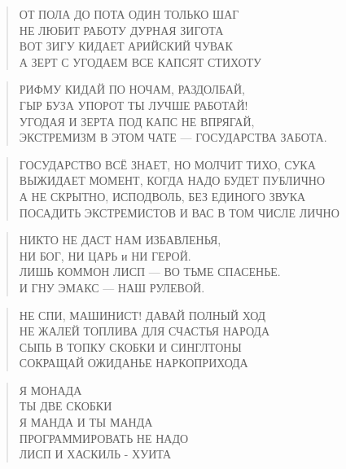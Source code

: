 \poemtitle{***}
\begin{verse}
ОТ ПОЛА ДО ПОТА ОДИН ТОЛЬКО ШАГ\\
НЕ ЛЮБИТ РАБОТУ ДУРНАЯ ЗИГОТА\\
ВОТ ЗИГУ КИДАЕТ АРИЙСКИЙ ЧУВАК\\
А ЗЕРТ С УГОДАЕМ ВСЕ КАПСЯТ СТИХОТУ
\end{verse}

\poemtitle{***}
\begin{verse}
РИФМУ КИДАЙ ПО НОЧАМ, РАЗДОЛБАЙ,\\
ГЫР БУЗА УПОРОТ ТЫ ЛУЧШЕ РАБОТАЙ!\\
УГОДАЯ И ЗЕРТА ПОД КАПС НЕ ВПРЯГАЙ,\\
ЭКСТРЕМИЗМ В ЭТОМ ЧАТЕ — ГОСУДАРСТВА ЗАБОТА.
\end{verse}

\poemtitle{***}
\begin{verse}
ГОСУДАРСТВО ВСЁ ЗНАЕТ, НО МОЛЧИТ ТИХО, СУКА\\
ВЫЖИДАЕТ МОМЕНТ, КОГДА НАДО БУДЕТ ПУБЛИЧНО\\
А НЕ СКРЫТНО, ИСПОДВОЛЬ, БЕЗ ЕДИНОГО ЗВУКА\\
ПОСАДИТЬ ЭКСТРЕМИСТОВ И ВАС В ТОМ ЧИСЛЕ ЛИЧНО
\end{verse}

\poemtitle{***}
\begin{verse}
НИКТО НЕ ДАСТ НАМ ИЗБАВЛЕНЬЯ,\\
НИ БОГ, НИ ЦАРЬ и НИ ГЕРОЙ.\\
ЛИШЬ КОММОН ЛИСП --- ВО ТЬМЕ СПАСЕНЬЕ.\\
И ГНУ ЭМАКС ---  НАШ РУЛЕВОЙ.
\end{verse}

\poemtitle{***}
\begin{verse}
НЕ СПИ, МАШИНИСТ! ДАВАЙ ПОЛНЫЙ ХОД\\
НЕ ЖАЛЕЙ ТОПЛИВА ДЛЯ СЧАСТЬЯ НАРОДА\\
СЫПЬ В ТОПКУ СКОБКИ И СИНГЛТОНЫ\\
СОКРАЩАЙ ОЖИДАНЬЕ НАРКОПРИХОДА
\end{verse}

\poemtitle{***}
\begin{verse}
Я МОНАДА\\
ТЫ ДВЕ СКОБКИ\\
Я МАНДА И ТЫ МАНДА\\
ПРОГРАММИРОВАТЬ НЕ НАДО\\
ЛИСП И ХАСКИЛЬ - ХУИТА
\end{verse}

